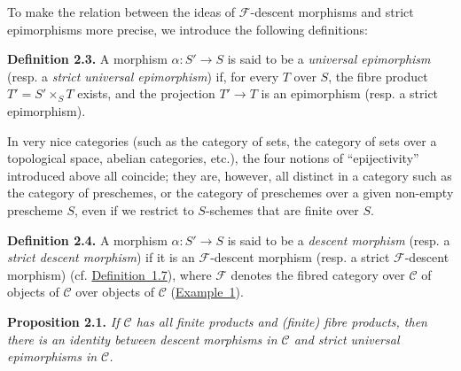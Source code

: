 \documentclass{article}
\newenvironment{itenv}[1]
  {\phantomsection\par\medskip\noindent\textbf{#1.}\itshape}
  {\medskip}
\newenvironment{rmenv}[1]
  {\phantomsection\par\medskip\noindent\textbf{#1.}\rmfamily}
  {\medskip}
\renewcommand{\cal}[1]{{\mathcal{#1}}}
\begin{document}
To make the relation between the ideas of $\cal{F}$-descent morphisms and strict epimorphisms more precise, we introduce the following definitions:

\begin{rmenv}{Definition 2.3}
  A morphism $\alpha\colon S'\to S$ is said to be a \emph{universal epimorphism} (resp. a \emph{strict universal epimorphism}) if, for every $T$ over $S$, the fibre product $T'=S'\times_S T$ exists, and the projection $T'\to T$ is an epimorphism (resp. a strict epimorphism).
\end{rmenv}

In very nice categories (such as the category of sets, the category of sets over a topological space, abelian categories, etc.), the four notions of ``epijectivity'' introduced above all coincide;
they are, however, all distinct in a category such as the category of preschemes, or the category of preschemes over a given non-empty prescheme $S$, even if we restrict to $S$-schemes that are finite over $S$.

\begin{rmenv}{Definition 2.4}
\label{definition:A.2.4}
  A morphism $\alpha\colon S'\to S$ is said to be a \emph{descent morphism} (resp. a \emph{strict descent morphism}) if it is an $\cal{F}$-descent morphism (resp. a strict $\cal{F}$-descent morphism) (cf. \hyperref[definition:A.1.7]{Definition~1.7}), where $\cal{F}$ denotes the fibred category over $\cal{C}$ of objects of $\cal{C}$ over objects of $\cal{C}$ (\hyperref[example:A.1.1(1)]{Example~1}).
\end{rmenv}

\begin{itenv}{Proposition 2.1}
  If $\cal{C}$ has all finite products and (finite) fibre products, then there is an identity between descent morphisms in $\cal{C}$ and strict universal epimorphisms in $\cal{C}$.
\end{itenv}


\subsection{}
\label{A.2.b}
\end{document}
